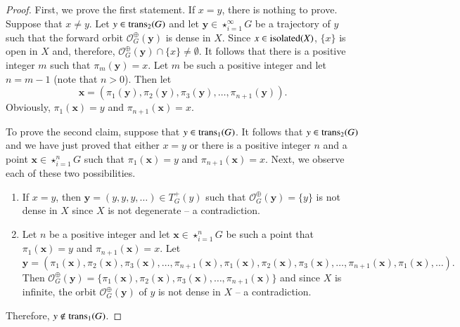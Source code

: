 \documentclass[a4paper,12pt]{article} %
\newcommand{\orbit}{\mathcal{O}^{\oplus}}
\newcommand{\isolated}{\textup{isolated}}
\newcommand{\tplus}{T^{+}}
\newcommand{\trans}{\textup{trans}}
\begin{document}
\begin{proof}
First, we prove the first statement.  If $x=y$, there is nothing to prove.  Suppose that $x\neq y$.  Let $y\in \trans_2(G)$ and let $\mathbf y\in \star_{i=1}^{\infty}G$ be a trajectory of $y$ such that the forward orbit  $\orbit_G(\mathbf y)$ is dense in $X$.  Since $x\in \isolated(X)$, $\{x\}$ is open in $X$ and, therefore, $\orbit_G(\mathbf y)\cap \{x\}\neq \emptyset$.  It follows that there is a positive integer  $m$  such that $\pi_m(\mathbf y)=x$.  Let $m$ be such a positive integer and let $n=m-1$ (note that $n>0$).  Then let 
$$
\mathbf x=(\pi_1(\mathbf y),\pi_2(\mathbf y),\pi_3(\mathbf y),\ldots,\pi_{n+1}(\mathbf y)).
$$
Obviously, $\pi_1(\mathbf x)=y$ and $\pi_{n+1}(\mathbf x)=x$.

To prove the second claim, suppose that $y\in \trans_1(G)$. It follows that $y\in \trans_2(G)$ and we have just proved that either $x=y$ or there is a positive integer $n$ and a point $\mathbf x\in \star_{i=1}^nG$ such that  $\pi_1(\mathbf x)=y$ and $\pi_{n+1}(\mathbf x)=x$.  Next, we observe each of these two possibilities.
\begin{enumerate}
\item If $x=y$, then $\mathbf y=(y,y,y,\ldots)\in \tplus_G(y)$
 such that $\orbit_G(\mathbf y)=\{y\}$ is not dense in $X$ since $X$ is not degenerate -- a contradiction.
 \item Let $n$ be a positive integer and let $\mathbf x\in \star_{i=1}^nG$ be such a point that  $\pi_1(\mathbf x)=y$ and $\pi_{n+1}(\mathbf x)=x$.  Let
 $$
 \mathbf y=(\pi_1(\mathbf x),\pi_2(\mathbf x),\pi_3(\mathbf x),\ldots,\pi_{n+1}(\mathbf x),\pi_1(\mathbf x),\pi_2(\mathbf x),\pi_3(\mathbf x),\ldots,\pi_{n+1}(\mathbf x),\pi_1(\mathbf x),\ldots).
 $$
 Then $\orbit_G(\mathbf y)=\{\pi_1(\mathbf x),\pi_2(\mathbf x),\pi_3(\mathbf x),\ldots,\pi_{n+1}(\mathbf x)\}$ and since $X$ is infinite,  the orbit $\orbit_G(\mathbf y)$ of $y$ is not dense in $X$ -- a contradiction. 
\end{enumerate}
Therefore,  $y\not\in \trans_1(G)$. 
\end{proof}
\end{document}
